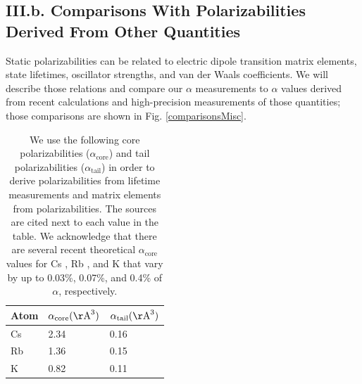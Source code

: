\documentclass[twocolumn,prl,showpacs,superscriptaddress]{revtex4-1}   %
\newcommand{\figref}[1]{Fig. \ref{#1}}
\newcommand{\acore}{\alpha_{\textrm{core}}}
\newcommand{\atail}{\alpha_{\textrm{tail}}}
\newcommand{\AAA}{\mathrm{\AA}}
\begin{document}
\subsection{III.b. Comparisons With Polarizabilities Derived From Other Quantities}

Static polarizabilities can be related to electric dipole transition matrix elements, state lifetimes, oscillator strengths, and van der Waals coefficients. We will describe those relations and compare our $\alpha$ measurements to $\alpha$ values derived from recent calculations and high-precision measurements of those quantities; those comparisons are shown in \figref{comparisonsMisc}.

\begingroup
\begin{table}
\caption{\label{tableCoreTail}We use the following core polarizabilities ($\acore$) and tail polarizabilities ($\atail$) in order to derive polarizabilities from lifetime measurements and matrix elements from polarizabilities. The sources are cited next to each value in the table. We acknowledge that there are several recent theoretical $\acore$ values for 
Cs \cite{Sansonetti1981,Johnson1983,Safronova1999,Derevianko2001}, 
Rb \cite{Johnson1983,Safronova1999}, and 
K \cite{Johnson1983,Muller1984}
that vary by up to 0.03\%, 0.07\%, and 0.4\% of $\alpha$, respectively.}
\begin{center}
\begin{tabular}{l l l}
\hline\hline
Atom & $\acore (\AAA^3)$ & $\atail (\AAA^3)$ \\
\hline
Cs & 2.34 \cite{Lim2002} & 0.16 \cite{Derevianko2001} \\
Rb & 1.36 \cite{Lim2002} & 0.15 \cite{Safronova2011} \\
K  & 0.82 \cite{Lim2002} & 0.11 \cite{Sahoo2013} \\
\hline\hline
\end{tabular}
\end{center}
\end{table}
\endgroup
\end{document}
